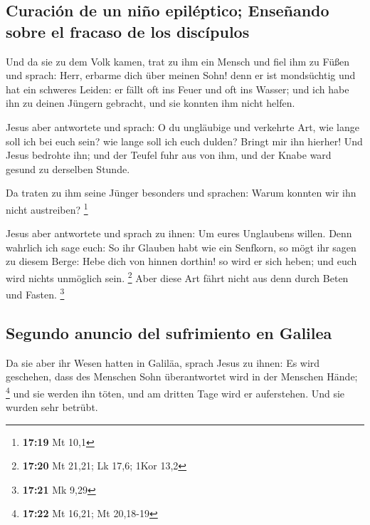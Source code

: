 \hypertarget{curaciuxf3n-de-un-niuxf1o-epiluxe9ptico-enseuxf1ando-sobre-el-fracaso-de-los-discuxedpulos}{%
\subsection{Curación de un niño epiléptico; Enseñando sobre el fracaso
de los
discípulos}\label{curaciuxf3n-de-un-niuxf1o-epiluxe9ptico-enseuxf1ando-sobre-el-fracaso-de-los-discuxedpulos}}

 Und da sie zu dem Volk kamen, trat zu ihm ein Mensch und
fiel ihm zu Füßen  und sprach: Herr, erbarme dich über
meinen Sohn! denn er ist mondsüchtig und hat ein schweres Leiden: er
fällt oft ins Feuer und oft ins Wasser;  und ich habe ihn
zu deinen Jüngern gebracht, und sie konnten ihm nicht helfen.

 Jesus aber antwortete und sprach: O du ungläubige und
verkehrte Art, wie lange soll ich bei euch sein? wie lange soll ich euch
dulden? Bringt mir ihn hierher!  Und Jesus bedrohte ihn;
und der Teufel fuhr aus von ihm, und der Knabe ward gesund zu derselben
Stunde.

 Da traten zu ihm seine Jünger besonders und sprachen:
Warum konnten wir ihn nicht austreiben? \footnote{\textbf{17:19} Mt 10,1}

 Jesus aber antwortete und sprach zu ihnen: Um eures
Unglaubens willen. Denn wahrlich ich sage euch: So ihr Glauben habt wie
ein Senfkorn, so mögt ihr sagen zu diesem Berge: Hebe dich von hinnen
dorthin! so wird er sich heben; und euch wird nichts unmöglich sein.
\footnote{\textbf{17:20} Mt 21,21; Lk 17,6; 1Kor 13,2} 
Aber diese Art fährt nicht aus denn durch Beten und Fasten. \footnote{\textbf{17:21}
  Mk 9,29}

\hypertarget{segundo-anuncio-del-sufrimiento-en-galilea}{%
\subsection{Segundo anuncio del sufrimiento en
Galilea}\label{segundo-anuncio-del-sufrimiento-en-galilea}}

 Da sie aber ihr Wesen hatten in Galiläa, sprach Jesus zu
ihnen: Es wird geschehen, dass des Menschen Sohn überantwortet wird in
der Menschen Hände; \footnote{\textbf{17:22} Mt 16,21; Mt 20,18-19}
 und sie werden ihn töten, und am dritten Tage wird er
auferstehen. Und sie wurden sehr betrübt.

